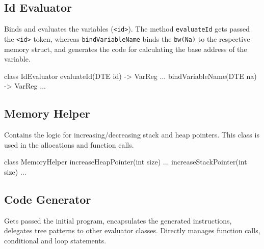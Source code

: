 \subsection{Id Evaluator}
Binds and evaluates the variables (\verb+<id>+). The method \verb+evaluateId+ gets passed the \verb+<id>+ token,
whereas \verb+bindVariableName+ binds the \verb+bw(Na)+ to the respective memory struct, and generates the code for
calculating the base address of the variable.
\begin{codeblock}[IdEvaluator]
class IdEvaluator {
    evaluateId(DTE id) -> VarReg { ... }
    bindVariableName(DTE na) -> VarReg { ... }
}
\end{codeblock}
\subsection{Memory Helper}
Contains the logic for increasing/decreasing stack and heap pointers. This class is used in the allocations and function calls.
\begin{codeblock}[MemoryHelper]
class MemoryHelper {
    increaseHeapPointer(int size) { ... }
    increaseStackPointer(int size) { ... }
}
\end{codeblock}
\newpage
\subsection{Code Generator}
Gets passed the initial program, encapsulates the generated instructions, delegates tree patterns to other
evaluator classes. Directly manages function calls, conditional and loop statements.

